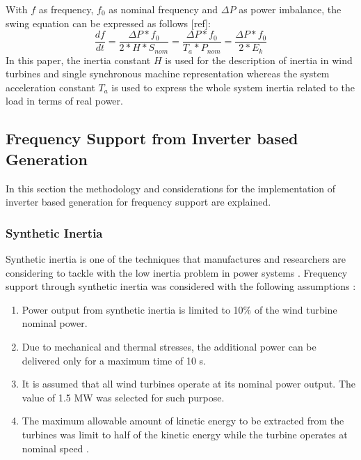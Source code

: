 With $f$ as frequency, $f_0$ as nominal frequency and $\Delta P$ as power imbalance, the swing equation can be expressed as follows [ref]:
\begin{equation}
	\label{eq:swing}
	\frac{df}{dt}=\dfrac{\Delta P*f_0}{2*H*S_{nom}}=\frac{\Delta P*f_0}{T_a*P_{nom}}=\frac{\Delta P*f_0}{2*E_k}
\end{equation}
In this paper, the inertia constant $ H $ is used for the description of inertia in wind turbines and single synchronous machine representation whereas the system acceleration constant $ T_a $ is used to express the whole system inertia related to the load in terms of real power.

\subsection{Frequency Support from Inverter based Generation}

In this section the methodology and considerations for the implementation of inverter based generation for frequency support are explained.
 
\subsubsection{Synthetic Inertia}

Synthetic inertia is one of the techniques that manufactures and researchers are considering to tackle with the low inertia problem in power systems \cite{Gevorgian.2017, GeneralElectricInternational.2013}. Frequency support through synthetic inertia was considered with the following assumptions \cite{dreidy2017inertia, nesje2015need}:
\begin{enumerate}[leftmargin=*,labelsep=4.9mm]
	\item Power output from synthetic inertia is limited to 10\% of the wind turbine nominal power.
	\item Due to mechanical and thermal stresses, the additional power can be delivered only for a maximum time of 10 s.
	\item It is assumed that all wind turbines operate at its nominal power output. The value of 1.5 MW was selected for such purpose.
	\item The maximum allowable amount of kinetic energy to be extracted from the turbines was limit to half of the kinetic energy while the turbine operates at nominal speed \cite{E.MuljadiV.GevorgianandM.Singh:NREL.2012}.

\end{enumerate}

